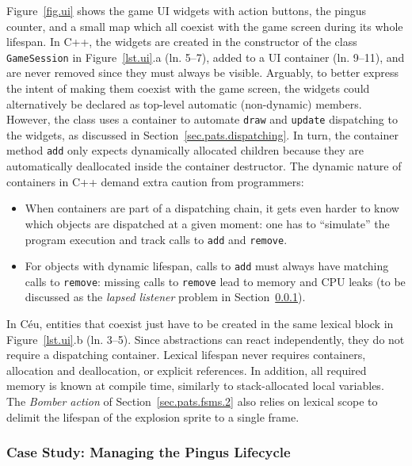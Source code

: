 \documentclass{vgtc}                          %
\newcommand{\code}[1] {{\small{\texttt{#1}}}}
\begin{document}
Figure~\ref{fig.ui} shows the game UI widgets with action buttons, the pingus
counter, and a small map which all coexist with the game screen during its
whole lifespan.
%
In C++, the widgets are created in the constructor of the class
\code{GameSession} in Figure~\ref{lst.ui}.a (ln. 5--7), added to a UI container
(ln. 9--11), and are never removed since they must always be visible.
Arguably, to better express the intent of making them coexist with the game
screen, the widgets could alternatively be declared as top-level automatic
(non-dynamic) members.
However, the class uses a container to automate \code{draw} and \code{update}
dispatching to the widgets, as discussed in Section~\ref{sec.pats.dispatching}.
In turn, the container method \code{add} only expects dynamically allocated
children because they are automatically deallocated inside the container
destructor.
%
The dynamic nature of containers in C++ demand extra caution from programmers:
%
\begin{itemize}
\item When containers are part of a dispatching chain, it gets even harder to
      know which objects are dispatched at a given moment:
      one has to ``simulate'' the program execution and track calls to
      \code{add} and \code{remove}.
\item For objects with dynamic lifespan, calls to \code{add} must always have
      matching calls to \code{remove}:
      missing calls to \code{remove} lead to memory and CPU leaks (to be
      discussed as the \emph{lapsed listener} problem in
      Section~\ref{sec.pats.lifespan.2}).
\end{itemize}

In Céu, entities that coexist just have to be created in the same lexical
block in Figure~\ref{lst.ui}.b (ln. 3--5).
%
Since abstractions can react independently, they do not require a dispatching
container.
%
Lexical lifespan never requires containers, allocation and deallocation, or
explicit references.
In addition, all required memory is known at compile time, similarly to
stack-allocated local variables.
%
The \emph{Bomber action} of Section~\ref{sec.pats.fsms.2} also relies on
lexical scope to delimit the lifespan of the explosion sprite to a single
frame.

\subsubsection{Case Study: Managing the Pingus Lifecycle}
\label{sec.pats.lifespan.2}
\end{document}

